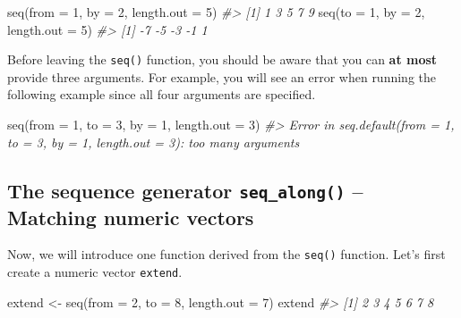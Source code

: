 \documentclass[
]{book}
\newenvironment{Shaded}{\begin{snugshade}}{\end{snugshade}}
\newcommand{\AttributeTok}[1]{\textcolor[rgb]{0.77,0.63,0.00}{#1}}
\newcommand{\CommentTok}[1]{\textcolor[rgb]{0.56,0.35,0.01}{\textit{#1}}}
\newcommand{\DecValTok}[1]{\textcolor[rgb]{0.00,0.00,0.81}{#1}}
\newcommand{\FunctionTok}[1]{\textcolor[rgb]{0.00,0.00,0.00}{#1}}
\newcommand{\NormalTok}[1]{#1}
\newcommand{\OtherTok}[1]{\textcolor[rgb]{0.56,0.35,0.01}{#1}}
\begin{document}
\begin{Shaded}
\begin{Highlighting}[]
\FunctionTok{seq}\NormalTok{(}\AttributeTok{from =} \DecValTok{1}\NormalTok{, }\AttributeTok{by =} \DecValTok{2}\NormalTok{, }\AttributeTok{length.out =} \DecValTok{5}\NormalTok{)}
\CommentTok{\#\textgreater{} [1] 1 3 5 7 9}
\FunctionTok{seq}\NormalTok{(}\AttributeTok{to =} \DecValTok{1}\NormalTok{, }\AttributeTok{by =} \DecValTok{2}\NormalTok{, }\AttributeTok{length.out =} \DecValTok{5}\NormalTok{)}
\CommentTok{\#\textgreater{} [1] {-}7 {-}5 {-}3 {-}1  1}
\end{Highlighting}
\end{Shaded}

Before leaving the \texttt{seq()} function, you should be aware that you can \textbf{at most} provide three arguments. For example, you will see an error when running the following example since all four arguments are specified.

\begin{Shaded}
\begin{Highlighting}[]
\FunctionTok{seq}\NormalTok{(}\AttributeTok{from =} \DecValTok{1}\NormalTok{, }\AttributeTok{to =} \DecValTok{3}\NormalTok{, }\AttributeTok{by =} \DecValTok{1}\NormalTok{, }\AttributeTok{length.out =} \DecValTok{3}\NormalTok{)}
\CommentTok{\#\textgreater{} Error in seq.default(from = 1, to = 3, by = 1, length.out = 3): too many arguments}
\end{Highlighting}
\end{Shaded}

\hypertarget{the-sequence-generator-seq_along-matching-numeric-vectors}{%
\subsection{\texorpdfstring{The sequence generator \texttt{seq\_along()} -- Matching numeric vectors}{The sequence generator seq\_along() -- Matching numeric vectors}}\label{the-sequence-generator-seq_along-matching-numeric-vectors}}

Now, we will introduce one function derived from the \texttt{seq()} function. Let's first create a numeric vector \texttt{extend}.

\begin{Shaded}
\begin{Highlighting}[]
\NormalTok{extend }\OtherTok{\textless{}{-}} \FunctionTok{seq}\NormalTok{(}\AttributeTok{from =} \DecValTok{2}\NormalTok{, }\AttributeTok{to =} \DecValTok{8}\NormalTok{, }\AttributeTok{length.out =} \DecValTok{7}\NormalTok{) }
\NormalTok{extend}
\CommentTok{\#\textgreater{} [1] 2 3 4 5 6 7 8}
\end{Highlighting}
\end{Shaded}
\end{document}
